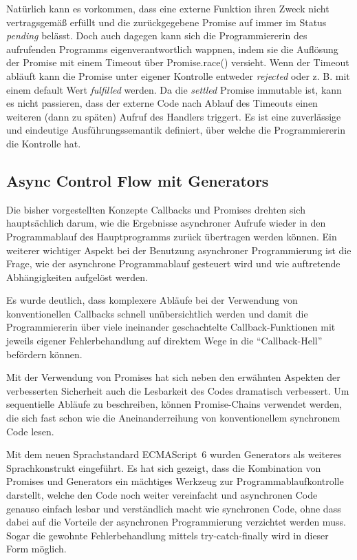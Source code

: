 \documentclass[
11pt, %
a4paper, %
oneside, %
pdfspacing, %
headinclude,
BCOR5mm, %
ngerman, %
bibtotocnumbered,
]{scrartcl}
\begin{document}
		Natürlich kann es vorkommen, dass eine externe Funktion ihren Zweck nicht vertragsgemäß erfüllt und die zurückgegebene Promise auf immer im Status \textit{pending} belässt. Doch auch dagegen kann sich die Programmiererin des aufrufenden Programms eigenverantwortlich wappnen, indem sie die Auflösung der Promise mit einem Timeout über \textsf{Promise.race()} versieht. 
		Wenn der Timeout abläuft kann die Promise unter eigener Kontrolle entweder \textit{rejected} oder z. B. mit einem default Wert \textit{fulfilled} werden. Da die \textit{settled} Promise immutable ist, kann es nicht passieren, dass der externe Code nach Ablauf des Timeouts einen weiteren (dann zu späten) Aufruf des Handlers triggert.		
		Es ist eine zuverlässige und eindeutige Ausführungssemantik definiert, über welche die Programmiererin die Kontrolle hat.

	\subsection{Async Control Flow mit Generators}
	Die bisher vorgestellten Konzepte Callbacks und Promises drehten sich hauptsächlich darum, wie die Ergebnisse asynchroner Aufrufe wieder in den Programmablauf des Hauptprogramms zurück übertragen werden können.
	Ein weiterer wichtiger Aspekt bei der Benutzung asynchroner Programmierung ist die Frage, wie der asynchrone Programmablauf gesteuert wird und wie auftretende Abhängigkeiten aufgelöst werden.
	
	Es wurde deutlich, dass komplexere Abläufe bei der Verwendung von konventionellen Callbacks schnell unübersichtlich werden und damit die Programmiererin über viele ineinander geschachtelte Callback-Funktionen mit jeweils eigener Fehlerbehandlung auf direktem Wege in die "`Callback-Hell"' befördern können.
	
	Mit der Verwendung von Promises hat sich neben den erwähnten Aspekten der verbesserten Sicherheit auch die Lesbarkeit des Codes dramatisch verbessert. Um sequentielle Abläufe zu beschreiben, können Promise-Chains verwendet werden, die sich fast schon wie die Aneinanderreihung von konventionellem synchronem Code lesen.

	Mit dem neuen Sprachstandard ECMAScript~6 wurden Generators als weiteres Sprachkonstrukt eingeführt. Es hat sich gezeigt, dass die Kombination von Promises und Generators ein mächtiges Werkzeug zur Programmablaufkontrolle darstellt, welche den Code noch weiter vereinfacht und asynchronen Code genauso einfach lesbar und verständlich macht wie synchronen Code, ohne dass dabei auf die Vorteile der asynchronen Programmierung verzichtet werden muss. Sogar die gewohnte Fehlerbehandlung mittels \textsf{try-catch-finally} wird in dieser Form möglich.
\end{document}
